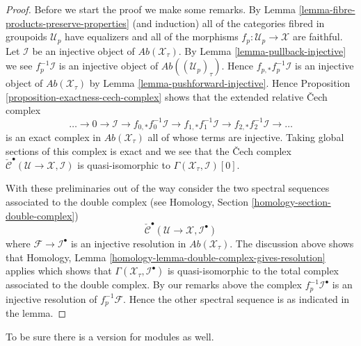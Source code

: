 \begin{proof}
Before we start the proof we make some remarks. By
Lemma \ref{lemma-fibre-products-preserve-properties}
(and induction) all of the categories fibred in groupoids $\mathcal{U}_p$
have equalizers and all of the morphisms $f_p : \mathcal{U}_p \to \mathcal{X}$
are faithful. Let $\mathcal{I}$ be an injective object
of $\textit{Ab}(\mathcal{X}_\tau)$. By
Lemma \ref{lemma-pullback-injective}
we see $f_p^{-1}\mathcal{I}$ is an injective object of
$\textit{Ab}((\mathcal{U}_p)_\tau)$.
Hence $f_{p, *}f_p^{-1}\mathcal{I}$ is an injective object of
$\textit{Ab}(\mathcal{X}_\tau)$ by
Lemma \ref{lemma-pushforward-injective}.
Hence
Proposition \ref{proposition-exactness-cech-complex}
shows that the extended relative {\v C}ech complex
$$
\ldots \to 0 \to
\mathcal{I} \to
f_{0, *}f_0^{-1}\mathcal{I} \to
f_{1, *}f_1^{-1}\mathcal{I} \to
f_{2, *}f_2^{-1}\mathcal{I} \to \ldots
$$
is an exact complex in $\textit{Ab}(\mathcal{X}_\tau)$ all of whose
terms are injective. Taking global sections of this complex is exact
and we see that the {\v C}ech complex
$\check{\mathcal{C}}^\bullet(\mathcal{U} \to \mathcal{X}, \mathcal{I})$
is quasi-isomorphic to $\Gamma(\mathcal{X}_\tau, \mathcal{I})[0]$.

\medskip\noindent
With these preliminaries out of the way consider the two spectral sequences
associated to the double complex (see
Homology, Section \ref{homology-section-double-complex})
$$
\check{\mathcal{C}}^\bullet(\mathcal{U} \to \mathcal{X}, \mathcal{I}^\bullet)
$$
where $\mathcal{F} \to \mathcal{I}^\bullet$ is an injective resolution
in $\textit{Ab}(\mathcal{X}_\tau)$.
The discussion above shows that
Homology, Lemma \ref{homology-lemma-double-complex-gives-resolution}
applies which shows that
$\Gamma(\mathcal{X}_\tau, \mathcal{I}^\bullet)$
is quasi-isomorphic to the total complex associated to the double complex.
By our remarks above the complex $f_p^{-1}\mathcal{I}^\bullet$ is an
injective resolution of $f_p^{-1}\mathcal{F}$. Hence the other spectral
sequence is as indicated in the lemma.
\end{proof}

\noindent
To be sure there is a version for modules as well.

